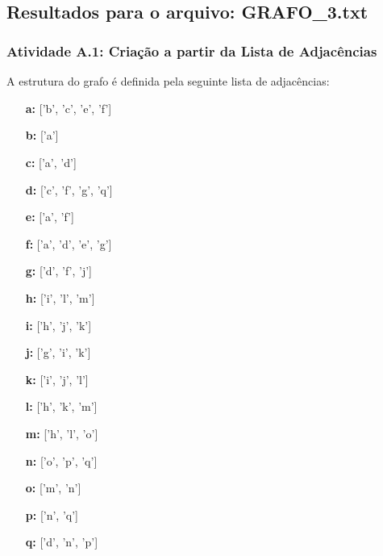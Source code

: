\documentclass[a4paper,12pt]{article}
\begin{document}
\\ \\

\subsection{Resultados para o arquivo: GRAFO\_3.txt}

\subsubsection*{Atividade A.1: Criação a partir da Lista de Adjacências}
A estrutura do grafo é definida pela seguinte lista de adjacências:
\begin{itemize}[leftmargin=*]
    \item[\textbf{a:}] ['b', 'c', 'e', 'f'] \item[\textbf{b:}] ['a'] \item[\textbf{c:}] ['a', 'd'] \item[\textbf{d:}] ['c', 'f', 'g', 'q']
    \item[\textbf{e:}] ['a', 'f'] \item[\textbf{f:}] ['a', 'd', 'e', 'g'] \item[\textbf{g:}] ['d', 'f', 'j']
    \item[\textbf{h:}] ['i', 'l', 'm'] \item[\textbf{i:}] ['h', 'j', 'k'] \item[\textbf{j:}] ['g', 'i', 'k']
    \item[\textbf{k:}] ['i', 'j', 'l'] \item[\textbf{l:}] ['h', 'k', 'm'] \item[\textbf{m:}] ['h', 'l', 'o']
    \item[\textbf{n:}] ['o', 'p', 'q'] \item[\textbf{o:}] ['m', 'n'] \item[\textbf{p:}] ['n', 'q'] \item[\textbf{q:}] ['d', 'n', 'p']
\end{itemize}
\end{document}
